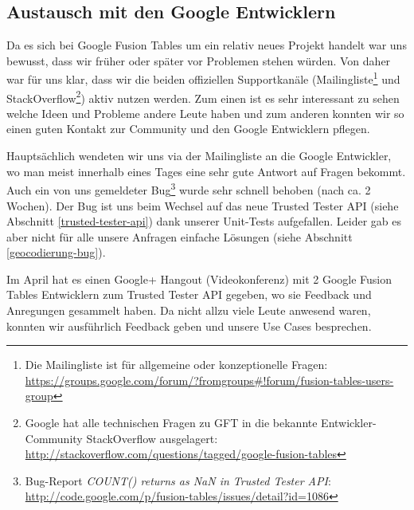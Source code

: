 \subsection{Austausch mit den Google Entwicklern}
\label{austausch-mit-google}
Da es sich bei Google Fusion Tables um ein relativ neues Projekt handelt war uns bewusst, dass wir früher oder später vor Problemen stehen würden. Von daher war für uns klar, dass wir die beiden offiziellen Supportkanäle (Mailingliste\footnote{Die Mailingliste ist für allgemeine oder konzeptionelle Fragen: \url{https://groups.google.com/forum/?fromgroups\#!forum/fusion-tables-users-group}} und StackOverflow\footnote{Google hat alle technischen Fragen zu GFT in die bekannte Entwickler-Community StackOverflow ausgelagert: \url{http://stackoverflow.com/questions/tagged/google-fusion-tables}}) aktiv nutzen werden. Zum einen ist es sehr interessant zu sehen welche Ideen und Probleme andere Leute haben und zum anderen konnten wir so einen guten Kontakt zur Community und den Google Entwicklern pflegen.

Hauptsächlich wendeten wir uns via der Mailingliste an die Google Entwickler, wo man meist innerhalb eines Tages eine sehr gute Antwort auf Fragen bekommt. Auch ein von uns gemeldeter Bug\footnote{Bug-Report \emph{COUNT() returns as NaN in Trusted Tester API}: \url{http://code.google.com/p/fusion-tables/issues/detail?id=1086}} wurde sehr schnell behoben (nach ca. 2 Wochen). Der Bug ist uns beim Wechsel auf das neue Trusted Tester API (siehe Abschnitt \ref{trusted-tester-api}) dank unserer Unit-Tests aufgefallen. Leider gab es aber nicht für alle unsere Anfragen einfache Lösungen (siehe Abschnitt \ref{geocodierung-bug}).

Im April hat es einen Google+ Hangout (Videokonferenz) mit 2 Google Fusion Tables Entwicklern zum Trusted Tester API gegeben, wo sie Feedback und Anregungen gesammelt haben. Da nicht allzu viele Leute anwesend waren, konnten wir ausführlich Feedback geben und unsere Use Cases besprechen.











